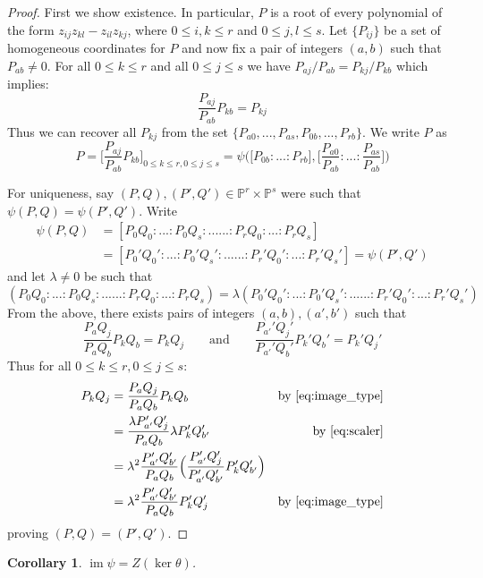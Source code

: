 \documentclass[12pt]{article}
\theoremstyle{plain}
\newtheorem{cor}[thm]{Corollary}
\theoremstyle{definition}
\newcommand{\bb}[1]{\mathbb{#1}}
\begin{document}
\begin{proof}
First we show existence. In particular, $P$ is a root of every polynomial of the form $z_{ij}z_{kl} - z_{il}z_{kj}$, where $0\leq i,k\leq r$ and $0\leq j,l\leq s$. Let $\lbrace P_{ij}\rbrace$ be a set of homogeneous coordinates for $P$ and now fix a pair of integers $(a,b)$ such that $P_{ab} \neq 0$. For all $0 \leq k\leq r$ and all $0 \leq j \leq s$ we have $P_{aj}/P_{ab} = P_{kj}/P_{kb}$ which implies:
\[\frac{P_{aj}}{P_{ab}}P_{kb} = P_{kj}\]
Thus we can recover all $P_{kj}$ from the set $\lbrace P_{a0},...,P_{as},P_{0b},...,P_{rb}\rbrace$. We write $P$ as
\[P = \Big[\frac{P_{aj}}{P_{ab}}P_{kb}\Big]_{0 \leq k \leq r, 0 \leq j \leq s} = \psi\Big(\big[P_{0b}:...:P_{rb}\big], \big[\frac{P_{a0}}{P_{ab}}:...:\frac{P_{as}}{P_{ab}}\big]\Big)\]

For uniqueness, say $(P,Q),(P',Q') \in \bb{P}^r \times \bb{P}^s$ were such that $\psi(P,Q) = \psi(P',Q')$. Write
\begin{align*}
    \psi(P,Q) &= [P_0Q_0:...:P_0Q_s:......:P_rQ_0:...:P_rQ_s]\\
    &= [P_0'Q_0':...:P_0'Q_s':......:P_r'Q_0':...:P_r'Q_s'] = \psi(P',Q')
\end{align*}
and let $\lambda \neq 0$ be such that 
\begin{equation}\label{eq:scaler}
(P_0Q_0:...:P_0Q_s:......:P_rQ_0:...:P_rQ_s) = \lambda (P_0'Q_0':...:P_0'Q_s':......:P_r'Q_0':...:P_r'Q_s')
\end{equation}
From the above, there exists pairs of integers $(a,b),(a',b')$ such that
\begin{equation}\label{eq:image_type}
    \frac{P_{a}Q_j}{P_{a}Q_b}P_kQ_b = P_kQ_j\qquad\text{and}\qquad \frac{P_{a'}'Q_j'}{P_{a'}'Q_b'}P_k'Q_b' = P_k'Q_j'
\end{equation}
Thus for all $0 \leq k \leq r, 0 \leq j \leq s$:
\begin{align*}
    P_kQ_j &= \frac{P_{a}Q_j}{P_{a}Q_b}P_kQ_b & \text{by }\eqref{eq:image_type}\\
    &= \frac{\lambda P'_{a'}Q'_j}{P_{a}Q_b}\lambda P'_kQ_{b'}' & \text{by }\eqref{eq:scaler}\\
    &= \lambda^2 \frac{P_{a'}'Q_{b'}'}{P_{a}Q_{b}} \Big(\frac{P_{a'}'Q_j'}{P_{a'}'Q_{b'}'}P_k'Q_{b'}'\Big)\\
    &= \lambda^2 \frac{P_{a'}'Q_{b'}'}{P_{a}Q_{b}} P_k'Q_j' & \text{by }\eqref{eq:image_type}
\end{align*}
proving $(P,Q) = (P',Q')$.
\end{proof}
\begin{cor}\label{cor:segre_image_kernel}
$\operatorname{im}\psi = Z(\operatorname{ker}\theta)$.
\end{cor}
\end{document}
